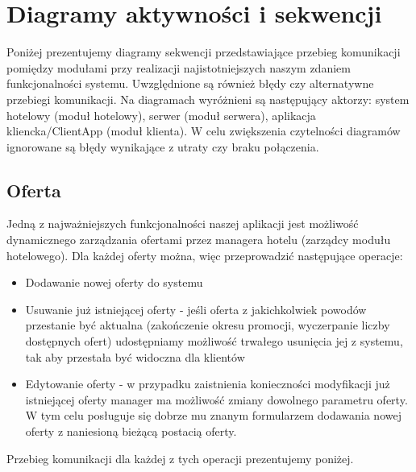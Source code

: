 \documentclass{article}
\begin{document}
\section{Diagramy aktywności i sekwencji}
Poniżej prezentujemy diagramy sekwencji przedstawiające przebieg komunikacji pomiędzy modułami przy realizacji najistotniejszych naszym zdaniem funkcjonalności systemu. Uwzględnione są również błędy czy alternatywne przebiegi komunikacji. Na diagramach wyróżnieni są następujący aktorzy: system hotelowy (moduł hotelowy), serwer (moduł serwera), aplikacja kliencka/ClientApp (moduł klienta). W celu zwiększenia czytelności diagramów ignorowane są błędy wynikające z utraty czy braku połączenia. 
\subsection{Oferta}
Jedną z najważniejszych funkcjonalności naszej aplikacji jest możliwość dynamicznego zarządzania ofertami przez managera hotelu (zarządcy modułu hotelowego). Dla każdej oferty można, więc przeprowadzić następujące operacje:
\begin{itemize}
    \item Dodawanie nowej oferty do systemu
    \item Usuwanie już istniejącej oferty - jeśli oferta z jakichkolwiek powodów przestanie być aktualna (zakończenie okresu promocji, wyczerpanie liczby dostępnych ofert) udostępniamy możliwość trwałego usunięcia jej z systemu, tak aby przestała być widoczna dla klientów
    \item Edytowanie oferty - w przypadku zaistnienia konieczności modyfikacji już istniejącej oferty manager ma możliwość zmiany dowolnego parametru oferty. W tym celu posługuje się dobrze mu znanym formularzem dodawania nowej oferty z naniesioną bieżącą postacią oferty.  
\end{itemize}
Przebieg komunikacji dla każdej z tych operacji prezentujemy poniżej.
\end{document}
